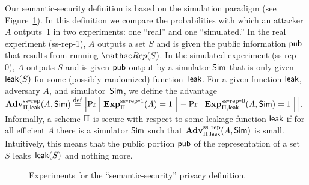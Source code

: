 Our semantic-security definition is based on the simulation paradigm (see Figure~\ref{fig:privacy-ss}).
In this definition we compare the probabilities with which an attacker $A$ outputs~1
in two experiments: one ``real'' and one ``simulated.''
In the real experiment (ss-rep-1), $A$ outputs a set $S$  and is given the
public information ${\sf pub}$ that results from running $\Rep(S)$.
In the simulated experiment (ss-rep-0), $A$ outputs $S$ and is given ${\sf pub}$ output
by a simulator ${\sf Sim}$ that is only given ${\sf leak}(S)$ for some (possibly randomized)
function~${\sf leak}$.
For a given function ${\sf leak}$, adversary $A$, and simulator~${\sf Sim}$,
we define the advantage
$\mathrm{\mathbf{Adv}}^{\mathrm{ss\mbox{-}rep}}_{\Pi,{\sf leak}}(A,{\sf Sim}) \stackrel{\rm def}{=}
\left| \Pr\left[\: \mathrm{\mathbf{Exp}}^{\mathrm{ss\mbox{-}rep\mbox{-}1}}_{\Pi}(A)=1 \:\right] -
\Pr\left[\: \mathrm{\mathbf{Exp}}^{\mathrm{ss\mbox{-}rep\mbox{-}0}}_{\Pi,{\sf leak}}(A, {\sf Sim})=1 \:\right] \right|$.
Informally, a scheme $\Pi$ is secure with respect to some leakage function ${\sf leak}$
if for all efficient $A$ there is a simulator ${\sf Sim}$ such that
$\mathrm{\mathbf{Adv}}^{\mathrm{ss\mbox{-}rep}}_{\Pi,{\sf leak}}(A,{\sf Sim})$ is small.
Intuitively, this means that the public portion
${\sf pub}$ of the representation of a set~$S$ leaks~${\sf leak}(S)$ and nothing more.
\begin{figure}[tp]
\centering
{}
\caption{Experiments for the ``semantic-security'' privacy
  definition.}
\label{fig:privacy-ss}
\end{figure}

